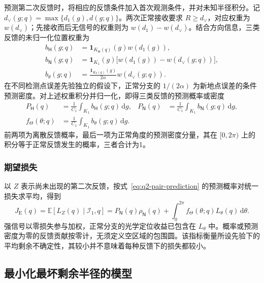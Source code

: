 预测第二次反馈时，将相应的反馈条件加入首次观测条件，并对未知半径积分。记 \(d_\vee(g;q)=\max\{d_1(g),d(g;q)\}\)。两次正常接收要求 \(R\ge d_\vee\)，对应权重为 \(w(d_\vee)\)；先接收而后无信号的权重则为 \(w(d_1)-w(d_\vee)\)。结合方向信息，三类反馈的未归一化位置权重为
\begin{equation}
\begin{aligned}
 b_{\mathsf H}(g;q)&=\mathbf1_{K_{\mathsf H}(q)}(g)w(d_1(g)),\\
 b_{\mathsf N}(g;q)&=\mathbf1_{K_1}(g)\bigl[w(d_1(g))-w(d_\vee(g;q))\bigr],\\
 b_\theta(g;q)&=\frac{\mathbf1_{K_\theta(q)}(g)}{2\alpha}w(d_\vee(g;q)).
\end{aligned}
\label{eq:q2-pair-feedback-weights}
\end{equation}
在不同检测点误差先验独立的假设下，正常分支的 \(1/(2\alpha)\) 为新地点误差的条件预测密度。对上述权重积分并归一化，即得三类反馈的预测概率或密度
\begin{equation}
\begin{aligned}
 P_{\mathsf H}(q)&=\frac{1}{C_1}\int_{K_1}b_{\mathsf H}(g;q)\,\mathrm dg,
 &P_{\mathsf N}(q)&=\frac{1}{C_1}\int_{K_1}b_{\mathsf N}(g;q)\,\mathrm dg,\\
 f_\Theta(\theta;q)&=\frac{1}{C_1}\int_{K_1}b_\theta(g;q)\,\mathrm dg.
\end{aligned}
\label{eq:q2-pair-prediction}
\end{equation}
前两项为离散反馈概率，最后一项为正常角度的预测密度分量，其在 \([0,2\pi)\) 上的积分等于正常反馈发生的概率，三者合计为1。

\subsubsection{期望损失}

以 \(Z\) 表示尚未出现的第二次反馈，按式~\eqref{eq:q2-pair-prediction} 的预测概率对统一损失求平均，得到
\begin{equation}
 J_{\mathrm E}(q)=\mathbb E[L_Z(q)\mid\mathcal I_1,q]
 =P_{\mathsf N}(q)\rho_{\mathsf N}(q)
 +\int_0^{2\pi}f_\Theta(\theta;q)L_\theta(q)\,\mathrm d\theta.
\label{eq:q2-pair-expected-objective}
\end{equation}
强信号以零损失参与加权，正常分支的光学定位收益已包含在 \(L_\theta\) 中。概率或预测密度为零的反馈贡献按零计，无须定义空区域的包围圆。该指标衡量所设先验下的平均剩余不确定性，其较小并不意味着每种反馈下的损失都较小。

\subsection{最小化最坏剩余半径的模型}

